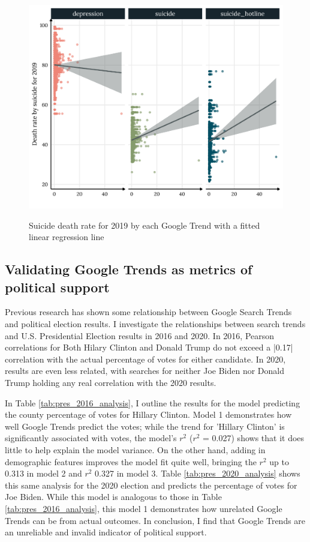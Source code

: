 
\begin{figure}[h]
{\centering \includegraphics[width=0.8\linewidth]{figs/paper1/suicide_plot-1.pdf}}
\caption{Suicide death rate for 2019 by each Google Trend with a fitted linear regression line}\label{fig:suicide_plot-1}
\end{figure}

\subsection{Validating Google Trends as metrics of political support}

Previous research has shown some relationship between Google Search Trends and
political election results. I investigate the relationships between search trends
and U.S. Presidential Election results in 2016 and 2020. In 2016, Pearson
correlations for Both Hilary Clinton and Donald Trump do not exceed a |0.17|
correlation with the actual percentage of votes for either candidate. In 2020,
results are even less related, with searches for neither Joe Biden nor Donald
Trump holding any real correlation with the 2020 results.

In Table \ref{tab:pres_2016_analysis}, I outline the results for the model
predicting the county percentage of votes for Hillary Clinton. Model 1
demonstrates how well Google Trends predict the votes; while the
trend for 'Hillary Clinton' is significantly associated with votes, the model's
$r^2$ ($r^2$ = 0.027) shows that it does little to help explain the model
variance. On the other hand, adding in demographic features improves the model
fit quite well, bringing the $r^2$ up to 0.313 in model 2 and $r^2$ 0.327 in
model 3. Table \ref{tab:pres_2020_analysis} shows this same analysis for the
2020 election and predicts the percentage of votes for Joe Biden. While this
model is analogous to those in Table \ref{tab:pres_2016_analysis}, this
model 1 demonstrates how unrelated Google Trends can be from actual outcomes. In
conclusion, I find that Google Trends are an unreliable and invalid indicator of
political support.

